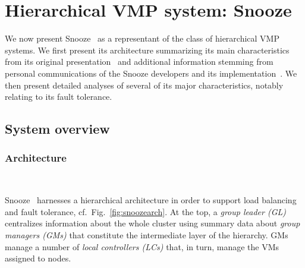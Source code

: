 \section{Hierarchical VMP system: Snooze}

We now present Snooze~\cite{feller:ccgrid12} as a representant of the
class of hierarchical VMP systems.  We first present its architecture
summarizing its main characteristics from its original
presentation~\cite{feller:ccgrid12} and additional information
stemming from personal communications of the Snooze developers and its
implementation~\cite{snoozeweb,snoozedev14}. We then present detailed
analyses of several of its major characteristics, notably relating to its
fault tolerance.

\subsection{System overview}

\subsubsection{Architecture}

~ 

Snooze~\cite{snoozeweb,feller:ccgrid12} harnesses a hierarchical
architecture in order to support load balancing and fault tolerance,
cf.\ Fig.~\ref{fig:snoozearch}.
At the top, %
 a \emph{group leader (GL)} centralizes information about the whole
cluster using summary data about \emph{group managers (GMs)} that
constitute the intermediate layer of the hierarchy. GMs manage a
number of \emph{local controllers (LCs)} that, in turn, manage the VMs
assigned to nodes.


